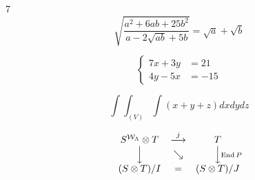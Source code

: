 \documentclass[12pt, fleqn]{article}
\begin{document}
	7
	\begin{equation} %
		\label{eq1} 
			\sqrt{\frac{a^2 + 6ab + 25b^2}{a - 2\sqrt{ab} + 5b}} = \sqrt{a} + \sqrt{b}
	\end{equation}
	
	\begin{equation} %
		\label{eq6} 
		\left \{
		\begin{aligned}
			7x + 3y &= 21 \\
			4y - 5x &= -15
		\end{aligned}
		\right .
	\end{equation}
	
	\begin{equation} %
		\label{eq7}  
			\int \int_(V) \int \left( x+y+z \right){dxdydz}
	\end{equation}
	
	\begin{equation} %
		\label{eq9}  
			$$\begin{array}{ccc} 
S^{\mathcal{W}_\Lambda}\otimes T& 
\stackrel{j}{\longrightarrow} & T\\ 
\Big \downarrow &\searrow & 
\Big\downarrow\vcenter{%
\rlap{$\scriptstyle{\mathrm{End}}\,P$}}\\ 
(S\otimes T)/I &=& (S\otimes T)/J 
\end{array}$$ 
	\end{equation}
\end{document}
